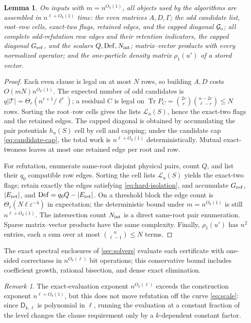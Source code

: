 \documentclass[11pt]{article}
\newtheorem{lemma}[lemma]{Lemma}
\theoremstyle{definition}
\theoremstyle{remark}
\newtheorem{remark}[remark]{Remark}
\newcommand{\1}{\mathbf 1}
\newcommand{\cG}{\mathcal G}
\newcommand{\cL}{\mathcal L}
\newcommand{\cT}{\mathcal T}
\newcommand{\eps}{\varepsilon}
\newcommand{\Dkl}{\mathsf D_{k,\ell}}
\newcommand{\rhoone}{\rho_1}
\DeclareMathOperator{\Tr}{Tr}
\DeclareMathOperator{\Def}{Def}
\numberwithin{equation}{section}
\begin{document}
\begin{lemma}\label{lem:construction}
On inputs with $m=n^{O_k(1)}$, all objects used by the algorithms are
assembled in $n^{\ell+O_k(1)}$ time: the even matrices $A,D,\Gamma$; the
odd candidate list, root--row cells, exact-two flags, retained edges,
and the capped diagonal $\cG_{\rm o}$; all complete odd-refutation row
edges and their retention indicators, the capped diagonal
$G_{\rm ref}$, and the scalars $Q,\Def,N_{\rm int}$; matrix--vector
products with every normalized operator; and the one-particle density
matrix $\rhoone(u')$ of a stored vector.
\end{lemma}
\begin{proof}
Each even clause is legal on at most $N$ rows, so building $A,D$ costs
$O(mN)n^{O_k(1)}$.  The expected number of odd candidates is
$q|\cT|=\Theta_r(n^{r+1}/\ell^r)$; a residual $C$ is legal on
$\Tr P_C=\binom{2r}{r}\binom{n-2r}{\ell-r}\le N$ rows.  Sorting the
root--row cells gives the lists $\cL_u(S)$, hence the exact-two flags
and the retained edges.  The capped diagonal is obtained by
accumulating the pair potentials $h_u(S)$ cell by cell and capping;
under the candidate cap \cref{eq:candidate-cap}, the total work is
$n^{\ell+O_k(1)}$ deterministically.  Mutual exact-twoness leaves at
most one retained edge per root and row.

For refutation, enumerate same-root disjoint physical pairs, count $Q$,
and list their $q_0$ compatible row edges.  Sorting the cell lists
$\cL_u(S)$ yields the exact-two flags; retain exactly the edges
satisfying \cref{eq:hard-isolation}, and accumulate $G_{\rm ref}$,
$|E_{\rm ret}|$, and $\Def=q_0Q-|E_{\rm ret}|$.  On a threshold block
the edge count is
$\Theta_r(N\ell\eps^{-4})$ in expectation; the deterministic
bound under $m=n^{O_k(1)}$ is still $n^{\ell+O_k(1)}$.  The intersection
count $N_{\rm int}$ is a direct same-root pair enumeration.  Sparse
matrix--vector products have the same complexity.  Finally,
$\rhoone(u')$ has $n^2$ entries, each a sum over at most
$\binom n{\ell-1}\le N$ terms.
\end{proof}

The exact spectral enclosures of \cref{sec:solvers} evaluate each
certificate with one-sided correctness in $n^{O_k(\ell)}$ bit operations;
this conservative bound includes coefficient growth, rational bisection,
and dense exact elimination.

\begin{remark}\label{rem:evaluation-exponent}
The exact-evaluation exponent $n^{O_k(\ell)}$ exceeds the construction
exponent $n^{\ell+O_k(1)}$, but this does not move refutation off the
curve \cref{eq:scale}: since $\Dkl$ is polynomial in $\ell$, running
the evaluation at a constant fraction of the level changes the clause
requirement only by a $k$-dependent constant factor.
\end{remark}
\end{document}
